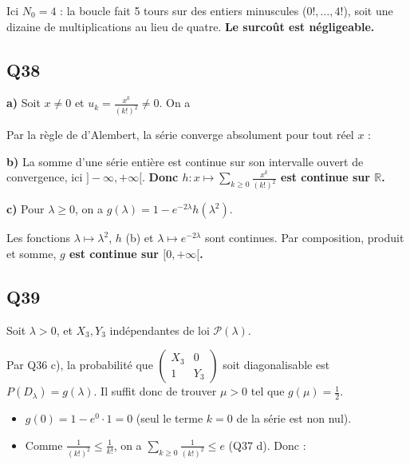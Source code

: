 \documentclass[11pt,a4paper]{article}
\providecommand{\tightlist}{\setlength{\itemsep}{0pt}\setlength{\parskip}{0pt}}
\newcommand{\equationajustee}[1]{%
  \sbox{\boiteequation}{$\displaystyle #1$}%
  \ifdim\wd\boiteequation>\linewidth
    \[\resizebox{\linewidth}{!}{\usebox{\boiteequation}}\]%
  \else
    \[#1\]%
  \fi}
\begin{document}
Ici \(N_0=4\) : la boucle fait 5 tours sur des entiers minuscules (\(0!,\dots,4!\)), soit une dizaine de multiplications au lieu de quatre. \textbf{Le surcoût est négligeable.}

\hypertarget{q38}{%
\subsection{Q38}\label{q38}}

\textbf{a)} Soit \(x\ne0\) et \(u_k=\frac{x^k}{(k!)^2}\ne0\). On a

\equationajustee{\left|\frac{u_{k+1}}{u_k}\right|=\frac{|x|}{(k+1)^2}\xrightarrow[k\to+\infty]{}0<1.}

Par la règle de d'Alembert, la série converge absolument pour tout réel \(x\) :

\equationajustee{\boxed{R=+\infty.}}

\textbf{b)} La somme d'une série entière est continue sur son intervalle ouvert de convergence, ici \(]-\infty,+\infty[\). \textbf{Donc \(h:x\mapsto\sum_{k\ge0}\frac{x^k}{(k!)^2}\) est continue sur \(\mathbb R\).}

\textbf{c)} Pour \(\lambda\ge0\), on a \(g(\lambda)=1-e^{-2\lambda}h(\lambda^2)\).

Les fonctions \(\lambda\mapsto\lambda^2\), \(h\) (b) et \(\lambda\mapsto e^{-2\lambda}\) sont continues. Par composition, produit et somme, \textbf{\(g\) est continue sur \([0,+\infty[\).}

\hypertarget{q39}{%
\subsection{Q39}\label{q39}}

Soit \(\lambda>0\), et \(X_3,Y_3\) indépendantes de loi \(\mathcal P(\lambda)\).

Par Q36 c), la probabilité que \(\begin{pmatrix}X_3&0\\1&Y_3\end{pmatrix}\) soit diagonalisable est \(P(D_\lambda)=g(\lambda)\). Il suffit donc de trouver \(\mu>0\) tel que \(g(\mu)=\frac12\).

\begin{itemize}
\tightlist
\item
  \(g(0)=1-e^0\cdot1=0\) (seul le terme \(k=0\) de la série est non nul).
\item
  Comme \(\frac1{(k!)^2}\le\frac1{k!}\), on a \(\sum_{k\ge0}\frac1{(k!)^2}\le e\) (Q37 d). Donc :
\end{itemize}
\end{document}
